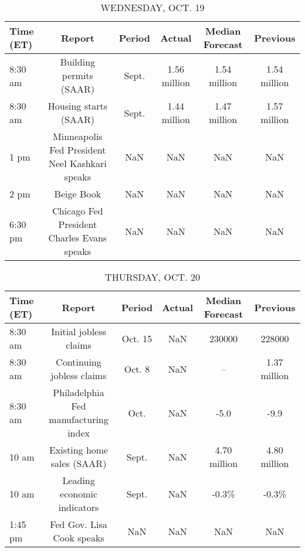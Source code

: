 \documentclass{article}%
\begin{document}
\begin{table}[htbp]%
\caption{WEDNESDAY, OCT. 19}%
\centering%
\begin{adjustbox}{width=1\textwidth}%
\begin{tabular}{lccccc}
\toprule
Time (ET) &                                         Report & Period &       Actual & Median Forecast &     Previous \\
\midrule
  8:30 am &                        Building permits (SAAR) &  Sept. & 1.56 million &    1.54 million & 1.54 million \\
  8:30 am &                          Housing starts (SAAR) &  Sept. & 1.44 million &    1.47 million & 1.57 million \\
     1 pm & Minneapolis Fed President Neel Kashkari speaks &    NaN &          NaN &             NaN &          NaN \\
     2 pm &                                     Beige Book &    NaN &          NaN &             NaN &          NaN \\
  6:30 pm &     Chicago Fed President Charles Evans speaks &    NaN &          NaN &             NaN &          NaN \\
\bottomrule
\end{tabular}
%
\end{adjustbox}%
\end{table}

%


\begin{table}[htbp]%
\caption{THURSDAY, OCT. 20}%
\centering%
\begin{adjustbox}{width=1\textwidth}%
\begin{tabular}{lccccc}
\toprule
Time (ET) &                               Report &  Period & Actual & Median Forecast &     Previous \\
\midrule
  8:30 am &               Initial jobless claims & Oct. 15 &    NaN &          230000 &       228000 \\
  8:30 am &            Continuing jobless claims &  Oct. 8 &    NaN &              -- & 1.37 million \\
  8:30 am & Philadelphia Fed manufacturing index &    Oct. &    NaN &            -5.0 &         -9.9 \\
    10 am &           Existing home sales (SAAR) &   Sept. &    NaN &    4.70 million & 4.80 million \\
    10 am &          Leading economic indicators &   Sept. &    NaN &           -0.3\% &        -0.3\% \\
  1:45 pm &            Fed Gov. Lisa Cook speaks &     NaN &    NaN &             NaN &          NaN \\
\bottomrule
\end{tabular}
%
\end{adjustbox}%
\end{table}
\end{document}
